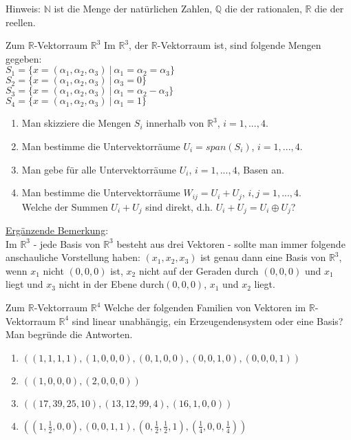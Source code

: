 \documentclass{uebblatt}
\begin{document}

Hinweis: $\mathbb{N}$ ist die Menge der natürlichen Zahlen, $\mathbb{Q}$ die der rationalen, $\mathbb{R}$ die der reellen.

\begin{aufgabe}{Zum $\mathbb{R}$-Vektorraum $\mathbb{R}^3$}
Im $\mathbb{R}^3$, der $\mathbb{R}$-Vektorraum ist, sind folgende Mengen gegeben:\\
$S_1 = \{x = (\alpha_1, \alpha_2, \alpha_3) \> | \> \alpha_1 = \alpha_2 = \alpha_3\}$\\
$S_2 = \{x = (\alpha_1, \alpha_2, \alpha_3) \> | \> \alpha_3 = 0\}$\\
$S_3 = \{x = (\alpha_1, \alpha_2, \alpha_3) \> | \> \alpha_1 = \alpha_2 - \alpha_3\}$\\
$S_4 = \{x = (\alpha_1, \alpha_2, \alpha_3) \> | \> \alpha_1 = 1\}$
\begin{enumerate}
\item Man skizziere die Mengen $S_i$ innerhalb von $\mathbb{R}^3$, $i = 1, ..., 4$.
\item Man bestimme die Untervektorräume $U­_i = span(S_i)$, $i = 1, ..., 4$.
\item Man gebe für alle Untervektorräume $U_i$, $i = 1, ..., 4$, Basen an.
\item Man bestimme die Untervektorräume $W_{ij} = U_i + U_j$, $i, j = 1, ..., 4$.\\
Welche der Summen $U_i + U_j$ sind direkt, d.h. $U_i + U_j = U_i \oplus U_j$?
\end{enumerate}
\underline{Ergänzende Bemerkung}:\\
Im $\mathbb{R}^3$ - jede Basis von $\mathbb{R}^3$ besteht aus drei Vektoren - sollte man immer folgende anschauliche Vorstellung haben: $(x­_1,x_2,x_3)$ ist genau dann eine Basis von $\mathbb{R}^3$, wenn $x_1$ nicht $(0,0,0)$ ist, $x_2$ nicht auf der Geraden durch $(0,0,0)$ und $x_1$ liegt und $x_3$ nicht in der Ebene durch\break$(0,0,0)$, $x_1$ und $x_2$ liegt. 
\end{aufgabe}


\begin{aufgabe}{Zum $\mathbb{R}$-Vektorraum $\mathbb{R}^4$}
Welche der folgenden Familien von Vektoren im $\mathbb{R}$-Vektorraum $\mathbb{R}^4$ sind linear unabhängig, ein Erzeugendensystem oder eine Basis? Man begründe die Antworten.
\begin{enumerate}
\item $((1, 1, 1, 1), (1, 0, 0, 0), (0, 1, 0, 0), (0, 0, 1, 0), (0, 0, 0, 1))$
\item $((1, 0, 0, 0), (2, 0, 0, 0))$
\item $((17, 39, 25, 10), (13, 12, 99, 4), (16, 1, 0, 0))$
\item $((1, \frac{1}{2}, 0, 0), (0, 0, 1, 1), (0, \frac{1}{2}, \frac{1}{2},1), (\frac{1}{4}, 0, 0, \frac{1}{4}))$
\end{enumerate}
\end{aufgabe}
\end{document}
